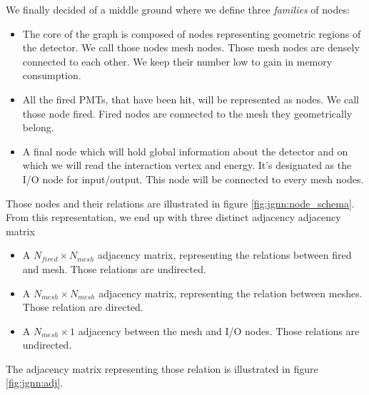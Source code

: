 \documentclass[../main.tex]{subfiles}
\begin{document}
We finally decided of a middle ground where we define three \textit{families} of nodes:
\begin{itemize}
  \item The core of the graph is composed of nodes representing geometric regions of the detector. We call those nodes {\color{Dandelion} mesh} nodes. Those mesh nodes are densely connected to each other. We keep their number low to gain in memory consumption.
  \item All the fired PMTs, that have been hit, will be represented as nodes. We call those node {\color{red} fired}. Fired nodes are connected to the mesh they geometrically belong.
  \item A final node which will hold global information about the detector and on which we will read the interaction vertex and energy. It's designated as the {\color{blue} I/O} node for input/output. This node will be connected to every mesh nodes.
\end{itemize}
Those nodes and their relations are illustrated in figure \ref{fig:jgnn:node_schema}. From this representation, we end up with three distinct adjacency adjacency matrix
\begin{itemize}
  \item A $N_{fired} \times N_{mesh}$ adjacency matrix, representing the relations between fired and mesh. Those relations are undirected.
  \item A $N_{mesh} \times N_{mesh}$ adjacency matrix, representing the relation between meshes. Those relation are directed.
  \item A $N_{mesh} \times 1$ adjacency between the mesh and I/O nodes. Those relations are undirected.
\end{itemize}
The adjacency matrix representing those relation is illustrated in figure \ref{fig:jgnn:adj}.
\end{document}
